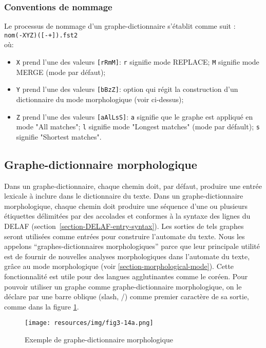 \subsubsection{Conventions de nommage}
Le processus de nommage d'un graphe-dictionnaire s'établit comme suit :\\

\verb$nom(-XYZ)([-+]).fst2$\\

\noindent où:
\begin{itemize}
\item \verb+X+ prend l'une des valeurs \verb+[rRmM]+: \verb+r+ signifie mode REPLACE; \verb+M+
signifie mode MERGE (mode par défaut);
\item \verb+Y+ prend l'une des valeurs \verb+[bBzZ]+: option qui régit la construction d'un
dictionnaire du mode morphologique (voir ci-dessus);
\item \verb+Z+ prend l'une des valeurs \verb+[aAlLsS]+: \verb+a+ signifie que le graphe est appliqué
en mode "All matches"; \verb+l+ signifie mode "Longest matches" (mode par défault); 
\verb+s+ signifie "Shortest matches".
\end{itemize}


\subsection{Graphe-dictionnaire morphologique}
\label{section-morphological-dictionary-graphs}
Dans un graphe-dictionnaire, chaque chemin doit, par défaut, produire une entrée lexicale à inclure dans le dictionnaire du
texte. Dans un graphe-dictionnaire morphologique, chaque chemin doit produire une séquence d'une ou plusieurs
étiquettes délimitées par des accolades et conformes à la syntaxe des lignes du DELAF
 (section~\ref{section-DELAF-entry-syntax}).
Les sorties de tels graphes seront utilisées comme entrées pour construire l'automate du texte. Nous
les appelons ``graphes-dictionnaires morphologiques'' parce que leur principale utilité est de
fournir de nouvelles analyses morphologiques dans l'automate du texte, grâce au mode morphologique
(voir \ref{section-morphological-mode}). Cette fonctionnalité est utile pour des langues
agglutinantes comme le coréen.
Pour pouvoir utiliser un graphe comme graphe-dictionnaire morphologique, on le déclare
par une barre oblique (slash, /) comme premier caractère de sa sortie, comme dans la figure \ref{morphoA}.

\begin{figure}[!ht]
\begin{center}
\texttt{[image: resources/img/fig3-14a.png]}
\caption{Exemple de graphe-dictionnaire morphologique\label{morphoA}}
\end{center}
\end{figure}

